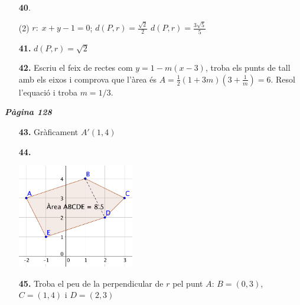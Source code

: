 \documentclass[a4paper, pdf, twoside]{book}
\begin{document}
\begin{multicols}{2}
\begin{enumerate}

 \item[\fontfamily{phv}\selectfont\color{blue}\textbf{40}. ] 
 \begin{tasks}[column-sep=1em, item-indent=1.3333em](2)
	 \task* $r:\;x+y-1=0$; $d(P,r)=\frac {\sqrt {2}}{2}$
	 \task $d(P,r)=\frac {3\sqrt {5}}{5}$
\end{tasks}
\vspace{0.25cm}
\item[\fontfamily{phv}\selectfont\color{blue}\textbf{41. }] 
$d(P,r)=\sqrt {2}$
\vspace{0.25cm}
\item[\fontfamily{phv}\selectfont\color{blue}\textbf{42. }]  \scalebox{0.6}{\simbolcompass } 
Escriu el feix de rectes com $y=1-m(x-3)$, troba els punts de tall amb els eixos i comprova que l'àrea és $A=\frac {1}{2}(1+3m)(3+\frac {1}{m})=6$. Resol l'equació i troba $m=1/3$.
 \end{enumerate}
\vspace{0.3cm}


{\textbf{\em Pàgina 128}} \hrulefill
\begin{enumerate}
\vspace{0.25cm}
\item[\fontfamily{phv}\selectfont\color{blue}\textbf{43. }] 
Gràficament $A'(1,4)$
 \end{enumerate}
\begin{enumerate}
\vspace{0.25cm}
\item[\fontfamily{phv}\selectfont\color{blue}\textbf{44. }] 
\mbox {}\par \includegraphics [width=0.4\textwidth ]{img-sol/t9-40}
\vspace{0.25cm}
\item[\fontfamily{phv}\selectfont\color{blue}\textbf{45. }]  \scalebox{0.6}{\simbolcompass } 
Troba el peu de la perpendicular de $r$ pel punt $A$: $B=(0,3)$, $C=(1,4)$ i $D=(2,3)$ 
\vspace{0.25cm}



\end{enumerate}
\end{multicols}
\end{document}
